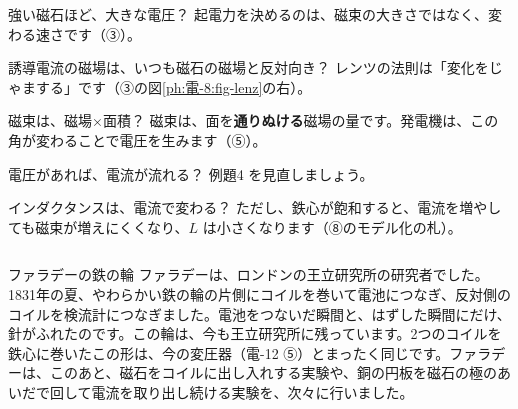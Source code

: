 \begin{tsumazuki}{強い磁石ほど、大きな電圧？}
起電力を決めるのは、磁束の大きさではなく、変わる速さです（③）。
\end{tsumazuki}

\begin{tsumazuki}{誘導電流の磁場は、いつも磁石の磁場と反対向き？}
レンツの法則は「変化をじゃまする」です（③の図\ref{ph:電-8:fig-lenz}の右）。
\end{tsumazuki}

\begin{tsumazuki}{磁束は、磁場×面積？}
磁束は、面を\textbf{通りぬける}磁場の量です。発電機は、この角が変わることで電圧を生みます（⑤）。
\end{tsumazuki}

\begin{tsumazuki}{電圧があれば、電流が流れる？}
例題4 を見直しましょう。
\end{tsumazuki}

\begin{tsumazuki}{インダクタンスは、電流で変わる？}
ただし、鉄心が飽和すると、電流を増やしても磁束が増えにくくなり、$L$ は小さくなります（⑧のモデル化の札）。
\end{tsumazuki}

\begin{column}{ファラデーの鉄の輪}
ファラデーは、ロンドンの王立研究所の研究者でした。1831年の夏、やわらかい鉄の輪の片側にコイルを巻いて電池につなぎ、反対側のコイルを検流計につなぎました。電池をつないだ瞬間と、はずした瞬間にだけ、針がふれたのです。この輪は、今も王立研究所に残っています。2つのコイルを鉄心に巻いたこの形は、今の変圧器（電-12 ⑤）とまったく同じです。ファラデーは、このあと、磁石をコイルに出し入れする実験や、銅の円板を磁石の極のあいだで回して電流を取り出し続ける実験を、次々に行いました。
\end{column}

